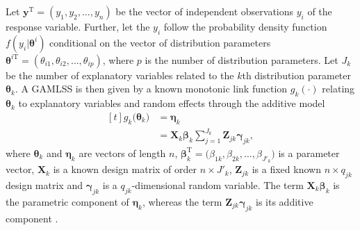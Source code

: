 Let \(\symbf{y}^{\text{T}} = (y_1, y_2, \ldots, y_n)\) be the vector of independent observations \(y_i\) of the response variable.  Further, let the \(y_i\) follow the probability density function \(f(y_i|\symbf{\theta}^i)\) conditional on the vector of distribution parameters \(\symbf{\theta}^{i \text{T}} = (\theta_{i 1}, \theta_{i 2}, \ldots, \theta_{i p})\), where \(p\) is the number of distribution parameters. Let \(J_k\) be the number of explanatory variables related to the \(k\)th distribution parameter \(\symbf{\theta}_k\).  A GAMLSS is then given by a known monotonic link function \(g_k(\cdot)\) relating \(\symbf{\theta}_k\) to explanatory variables and random effects through the additive model 
\begin{equation}
  \label{eq:GAMLSSRigbyStasinopoulos2005}
  \begin{aligned}[t]
    g_k\bigl(\symbf{\theta}_k\bigr) &= \symbf{\eta}_k \\
    &= \symbf{X}_k \symbf{\beta}_k \sum_{j = 1}^{J_k} \symbf{Z}_{j k} \symbf{\gamma}_{j k},
\end{aligned}
\end{equation}
where \(\symbf{\theta}_k\) and \(\symbf{\eta}_k\) are vectors of length \(n\), \(\symbf{\beta}_k^{\text{T}} = \bigl(\beta_{1 k}, \beta_{2 k}, \ldots, \beta_{J'_k }\bigr)\) is a parameter vector, \(\symbf{X}_k\) is a known design matrix of order \(n \times J'_k\), \(\symbf{Z}_{j k}\) is a fixed known \(n \times q_{j k}\) design matrix and \(\symbf{\gamma}_{j k}\) is a \(q_{j k}\)-dimensional random variable.  The term \(\symbf{X}_k \symbf{\beta}_k\) is the parametric component of \(\symbf{\eta}_k\), whereas the term \(\symbf{Z}_{j k} \symbf{\gamma}_{j k}\) is its additive component \parencite{Rigby2005}.

